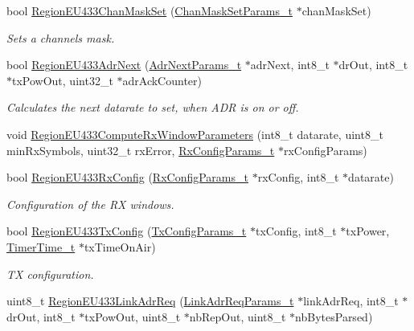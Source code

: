 \begin{DoxyCompactItemize}
bool \hyperlink{group__REGIONEU433_ga9f5e0e0881857bae99067d739c037882}{Region\+E\+U433\+Chan\+Mask\+Set} (\hyperlink{group__REGION_ga6d24f7da136006410827dfb29f6b9b9e}{Chan\+Mask\+Set\+Params\+\_\+t} $\ast$chan\+Mask\+Set)
\begin{DoxyCompactList}\small\item\em Sets a channels mask. \end{DoxyCompactList}\item 
bool \hyperlink{group__REGIONEU433_ga97dd9f8ccc0f0e354e4ccc2e3b3d4e6c}{Region\+E\+U433\+Adr\+Next} (\hyperlink{group__REGION_ga567c2742622326b350b4e91bbf61b4ce}{Adr\+Next\+Params\+\_\+t} $\ast$adr\+Next, int8\+\_\+t $\ast$dr\+Out, int8\+\_\+t $\ast$tx\+Pow\+Out, uint32\+\_\+t $\ast$adr\+Ack\+Counter)
\begin{DoxyCompactList}\small\item\em Calculates the next datarate to set, when A\+DR is on or off. \end{DoxyCompactList}\item 
void \hyperlink{group__REGIONEU433_ga5e88bc1903bb61a90df88fe8c1805705}{Region\+E\+U433\+Compute\+Rx\+Window\+Parameters} (int8\+\_\+t datarate, uint8\+\_\+t min\+Rx\+Symbols, uint32\+\_\+t rx\+Error, \hyperlink{group__REGION_ga375c038078dfcfc7ef14280021db719e}{Rx\+Config\+Params\+\_\+t} $\ast$rx\+Config\+Params)
\item 
bool \hyperlink{group__REGIONEU433_ga3a7bb7e75de6bfc5ef4edc1c934f5a50}{Region\+E\+U433\+Rx\+Config} (\hyperlink{group__REGION_ga375c038078dfcfc7ef14280021db719e}{Rx\+Config\+Params\+\_\+t} $\ast$rx\+Config, int8\+\_\+t $\ast$datarate)
\begin{DoxyCompactList}\small\item\em Configuration of the RX windows. \end{DoxyCompactList}\item 
bool \hyperlink{group__REGIONEU433_ga29a68f1a72dfccfe89f01de36ddc542b}{Region\+E\+U433\+Tx\+Config} (\hyperlink{group__REGION_gabed730d4d04b0b60d4b6d1966d3f21d3}{Tx\+Config\+Params\+\_\+t} $\ast$tx\+Config, int8\+\_\+t $\ast$tx\+Power, \hyperlink{utilities_8h_a4215ca43d3e953099ea758ce428599d0}{Timer\+Time\+\_\+t} $\ast$tx\+Time\+On\+Air)
\begin{DoxyCompactList}\small\item\em TX configuration. \end{DoxyCompactList}\item 
uint8\+\_\+t \hyperlink{group__REGIONEU433_gafd3e374d9048e67d54d1fa90b8d18723}{Region\+E\+U433\+Link\+Adr\+Req} (\hyperlink{group__REGION_gad4af503e8d4de1846129e26a799a1e8e}{Link\+Adr\+Req\+Params\+\_\+t} $\ast$link\+Adr\+Req, int8\+\_\+t $\ast$dr\+Out, int8\+\_\+t $\ast$tx\+Pow\+Out, uint8\+\_\+t $\ast$nb\+Rep\+Out, uint8\+\_\+t $\ast$nb\+Bytes\+Parsed)

\end{DoxyCompactItemize}

